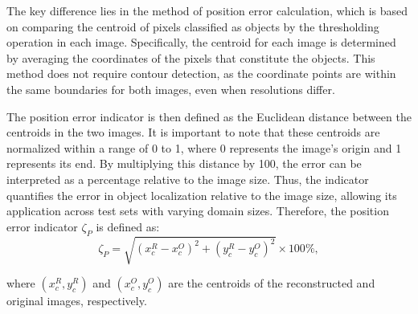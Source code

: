 \documentclass{IEEEtran}
\begin{document}
            The key difference lies in the method of position error calculation, which is based on comparing the centroid of pixels classified as objects by the thresholding operation in each image. Specifically, the centroid for each image is determined by averaging the coordinates of the pixels that constitute the objects. This method does not require contour detection, as the coordinate points are within the same boundaries for both images, even when resolutions differ.


            The position error indicator is then defined as the Euclidean distance between the centroids in the two images. It is important to note that these centroids are normalized within a range of 0 to 1, where 0 represents the image's origin and 1 represents its end. By multiplying this distance by 100, the error can be interpreted as a percentage relative to the image size. Thus, the indicator quantifies the error in object localization relative to the image size, allowing its application across test sets with varying domain sizes. Therefore, the position error indicator $\zeta_P$ is defined as:
            \begin{equation}
                \zeta_P = \sqrt{(x_c^R - x_c^O)^2 + (y_c^R-y_c^O)^2} \times 100\%, \label{eq:positionerror}
            \end{equation}

            \noindent where $(x_c^R, y_c^R)$ and $(x_c^O, y_c^O)$ are the centroids of the reconstructed and original images, respectively.

\end{document}
